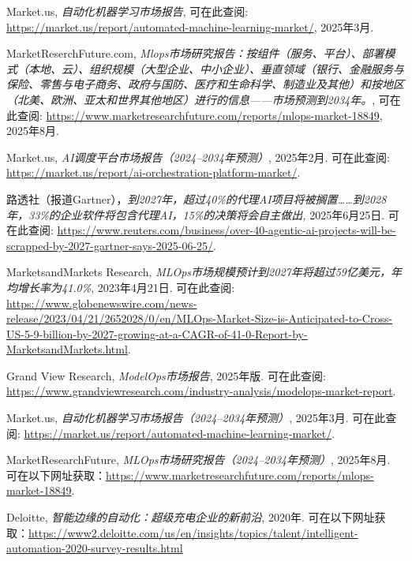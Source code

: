 \documentclass[11pt, a4paper, oneside]{article}
\begin{document}
\newpage
\begin{thebibliography}{99}
    Market.us, \textit{自动化机器学习市场报告}, 可在此查阅: \url{https://market.us/report/automated-machine-learning-market/}, 2025年3月.
    
    MarketReserchFuture.com, \textit{Mlops市场研究报告：按组件（服务、平台）、部署模式（本地、云）、组织规模（大型企业、中小企业）、垂直领域（银行、金融服务与保险、零售与电子商务、政府与国防、医疗和生命科学、制造业及其他）和按地区（北美、欧洲、亚太和世界其他地区）进行的信息——市场预测到2034年。}, 可在此查阅: \url{https://www.marketresearchfuture.com/reports/mlops-market-18849}, 2025年8月.
    
    Market.us, \textit{AI调度平台市场报告（2024--2034年预测）}, 2025年2月.  
    可在此查阅: \url{https://market.us/report/ai-orchestration-platform-market/}.

    路透社（报道Gartner），\textit{到2027年，超过40\%的代理AI项目将被搁置……到2028年，33\%的企业软件将包含代理AI，15\%的决策将会自主做出,} 2025年6月25日.  
    可在此查阅: \url{https://www.reuters.com/business/over-40-agentic-ai-projects-will-be-scrapped-by-2027-gartner-says-2025-06-25/}.

    MarketsandMarkets Research, \textit{MLOps市场规模预计到2027年将超过59亿美元，年均增长率为41.0\%}, 2023年4月21日.  
    可在此查阅: \url{https://www.globenewswire.com/news-release/2023/04/21/2652028/0/en/MLOps-Market-Size-is-Anticipated-to-Cross-US-5-9-billion-by-2027-growing-at-a-CAGR-of-41-0-Report-by-MarketsandMarkets.html}.

    Grand View Research, \textit{ModelOps市场报告}, 2025年版.  
    可在此查阅: \url{https://www.grandviewresearch.com/industry-analysis/modelops-market-report}.

    Market.us, \textit{自动化机器学习市场报告（2024--2034年预测）}, 2025年3月.  
    可在此查阅: \url{https://market.us/report/automated-machine-learning-market/}.

    MarketResearchFuture, \textit{MLOps市场研究报告（2024--2034年预测）}, 2025年8月.  
    可在以下网址获取：\url{https://www.marketresearchfuture.com/reports/mlops-market-18849}.

    Deloitte, \textit{智能边缘的自动化：超级充电企业的新前沿}, 2020年. 可在以下网址获取：\url{https://www2.deloitte.com/us/en/insights/topics/talent/intelligent-automation-2020-survey-results.html}


\end{thebibliography}
\end{document}
